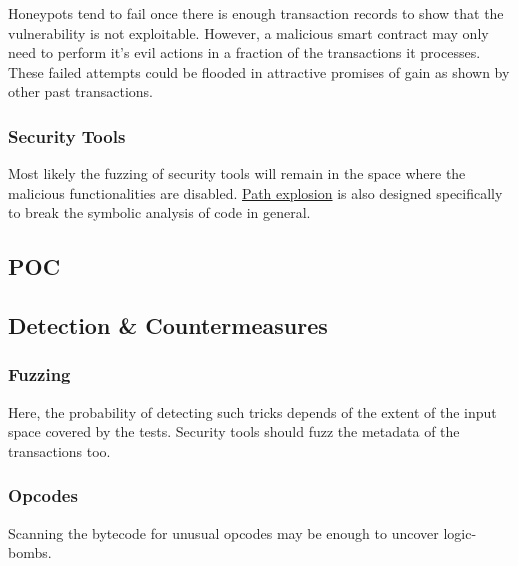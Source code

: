 Honeypots tend to fail once there is enough transaction records to show that the vulnerability is not exploitable.
However, a malicious smart contract may only need to perform it's evil actions in a fraction of the transactions it processes.
These failed attempts could be flooded in attractive promises of gain as shown by other past transactions.

\subsubsection{Security Tools}

Most likely the fuzzing of security tools will remain in the space where the malicious functionalities are disabled.
\href{\urlarticlepathexplosion}{Path explosion} is also designed specifically to break the symbolic analysis of code in general.

\subsection{POC}

\subsection{Detection \& Countermeasures}

\subsubsection{Fuzzing}

Here, the probability of detecting such tricks depends of the extent of the input space covered by the tests.
Security tools should fuzz the metadata of the transactions too.

\subsubsection{Opcodes}

Scanning the bytecode for unusual opcodes may be enough to uncover logic-bombs.
